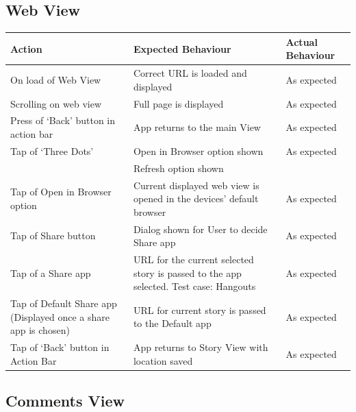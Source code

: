 \documentclass[11pt]{article}
\begin{document}
\subsection*{Web View}

\begin{center}
\begin{tabular}{ | p{5cm} | p{5cm} | p{5cm} |}
	\hline
	\textbf{Action} & \textbf{Expected Behaviour} & \textbf{Actual Behaviour} \\
    \hline
	On load of Web View & Correct URL is loaded and displayed & As expected \\
	\hline
	Scrolling on web view & Full page is displayed & As expected \\
	\hline
	Press of ‘Back' button in action bar & App returns to the main View & As expected \\
	\hline
	Tap of ‘Three Dots' & Open in Browser option shown & As expected \\ & Refresh option shown & \\
	\hline
	Tap of Open in Browser option & Current displayed web view is opened in the devices' default browser & As expected \\
	\hline
	Tap of Share button & Dialog shown for User to decide Share app & As expected \\
	\hline
Tap of a Share app & URL for the current selected story is passed to the app selected. Test case: Hangouts & As expected \\
	\hline
Tap of Default Share app (Displayed once a share app is chosen) & URL for current story is passed to the Default app & As expected \\
	\hline
Tap of ‘Back' button in Action Bar & App returns to Story View with location saved & As expected \\
	\hline

\end{tabular}
\end{center}

\subsection*{Comments View}
\end{document}
